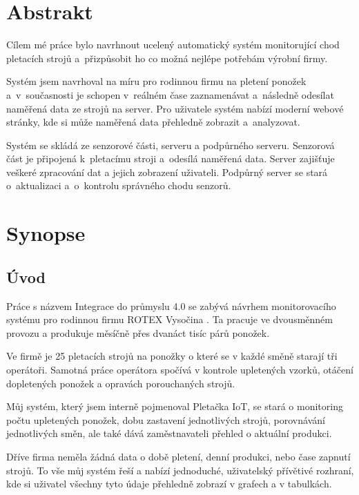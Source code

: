 \documentclass{template/socthesis}
\begin{document}


\chapter{Abstrakt}

Cílem mé práce bylo navrhnout ucelený automatický systém monitorující chod pletacích strojů a~přizpůsobit ho co možná nejlépe potřebám výrobní firmy.

Systém jsem navrhoval na míru pro rodinnou firmu na pletení ponožek a~v sou\-čas\-nos\-ti je schopen v~reálném čase zaznamenávat a~následně odesílat naměřená data ze strojů na server. 
Pro uživatele systém nabízí moderní webové stránky, kde si může naměřená data přehledně zobrazit a~analyzovat.

Systém se skládá ze senzorové části, serveru a podpůrného serveru.
Senzorová část je připojená k~pletacímu stroji a~odesílá naměřená data.
Server zajišťuje veškeré zpracování dat a jejich zobrazení uživateli.
Podpůrný server se stará o~aktualizaci a~o~kontrolu správného chodu senzorů.


\chapter{Synopse}

\section{Úvod}
Práce s názvem Integrace do průmyslu 4.0 se zabývá návrhem monitorovacího systému pro rodinnou firmu ROTEX Vysočina \cite{ROTEX}.
Ta pracuje ve dvousměnném provozu a produkuje měsíčně přes dvanáct tisíc párů ponožek.

Ve firmě je 25 pletacích strojů na ponožky o které se v každé směně starají tři operátoři.
Samotná práce operátora spočívá v kontrole upletených vzorků, otáčení dopletených ponožek a opravách porouchaných strojů.

Můj systém, který jsem interně pojmenoval Pletačka IoT, se stará o monitoring počtu upletených ponožek, dobu zastavení jednotlivých strojů, porovnávání jednotlivých směn, ale také dává zaměstnavateli přehled o aktuální produkci.

Dříve firma neměla žádná data o době pletení, denní  produkci, nebo čase zapnutí strojů.
To vše  můj systém řeší  a nabízí jednoduché, uživatelský přívětivé rozhraní, kde si uživatel všechny tyto údaje přehledně zobrazí v grafech a v tabulkách.
\end{document}
